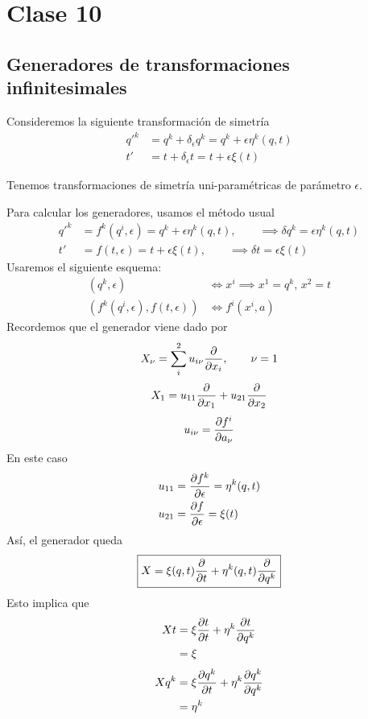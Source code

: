 \section{Clase 10}
\subsection{Generadores de transformaciones infinitesimales
}
Consideremos la siguiente transformación de simetría
\begin{align}
  q'^k&=q^k+\delta _\epsilon q^k=q^k+\epsilon\eta^k(q,t)\\
  t'&=t+\delta_\epsilon t=t+\epsilon\xi (t)
\end{align}

Tenemos transformaciones de simetría uni-paramétricas de parámetro $\epsilon$.

Para calcular los generadores, usamos el método usual
\begin{align}
  q'^k&=f^k(q^{i},\epsilon)=q^k+\epsilon \eta^k(q,t),\qquad\implies  \delta q^k=\epsilon\eta^k(q,t)\\
  t'&=f(t,\epsilon )=t+\epsilon\xi(t),\qquad \implies\delta t=\epsilon\xi(t)
\end{align}
Usaremos el siguiente esquema:
\begin{align}
  (q^k,\epsilon) &\Leftrightarrow x^{i}\implies x^1=q^k,\, x^2=t\\
  (f^k(q^{i},\epsilon),f(t,\epsilon))&\Leftrightarrow f^{i}(x^{i},a)
\end{align}
Recordemos que el generador viene dado por
\begin{equation}
  X_\nu =\sum_{i}^2u_{i\nu }\pdv{x_i},\qquad \nu =1
\end{equation}
\begin{equation}
  X_1=u_{11}\pdv{x_1}+u_{21}\pdv{x_2}
\end{equation}
\begin{equation}
  u_{i\nu }=\pdv{f^{i}}{a_\nu}
\end{equation}
En este caso
\begin{align}
  u_{11}&=\pdv{f^k}{\epsilon}=\eta^k(q,t)\\
  u_{21}&=\pdv{f}{\epsilon}=\xi(t)
\end{align}
Así, el generador queda
\begin{equation}
  \boxed{X=\xi(q,t)\pdv{t}+\eta^k(q,t)\pdv{q^k}}
\end{equation}
Esto implica que
\begin{align}
  Xt&=\xi\pdv{t}{t}+\eta^k\pdv{t}{q^k}\\
  &=\xi 
\end{align}
\begin{align}
  Xq^k&=\xi\pdv{q^k}{t}+\eta^k\pdv{q^k}{q^k}\\
  &=\eta^k
\end{align}

